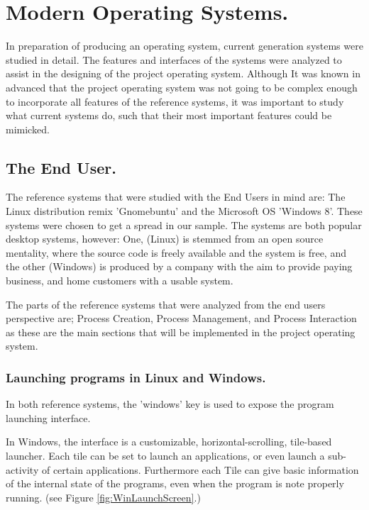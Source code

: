 \documentclass[a4paper]{report}
\begin{document}
\clearpage
\section*{Modern Operating Systems.}

In preparation of producing an operating system, current generation systems were studied in detail. The features and interfaces of the systems were analyzed to assist in the designing of the project operating system. Although It was known in advanced that the project operating system was not going to be complex enough to incorporate all features of the reference systems, it was important to study what current systems do, such that their most important features could be mimicked.

\subsection*{The End User.}
The reference systems that were studied with the End Users in mind are: The Linux distribution remix 'Gnomebuntu' and the Microsoft OS 'Windows 8'. These systems were chosen to get a spread in our sample. The systems are both popular desktop systems, however: One, (Linux) is stemmed from an open source mentality, where the source code is freely available and the system is free, and the other (Windows) is produced by a company with the aim to provide paying business, and home customers with a usable system.

The parts of the reference systems that were analyzed from the end users perspective are; Process Creation, Process Management, and Process Interaction as these are the main sections that will be implemented in the project operating system.

\subsubsection*{Launching programs in Linux and Windows.}

In both reference systems, the 'windows' key is used to expose the program launching interface.

In Windows, the interface is a customizable, horizontal-scrolling, tile-based launcher. Each tile can be set to launch an applications, or even launch a sub-activity of certain applications. Furthermore each Tile can give basic information of the internal state of the programs, even when the program is note properly running. (see Figure \ref{fig:WinLaunchScreen}.)
\end{document}

